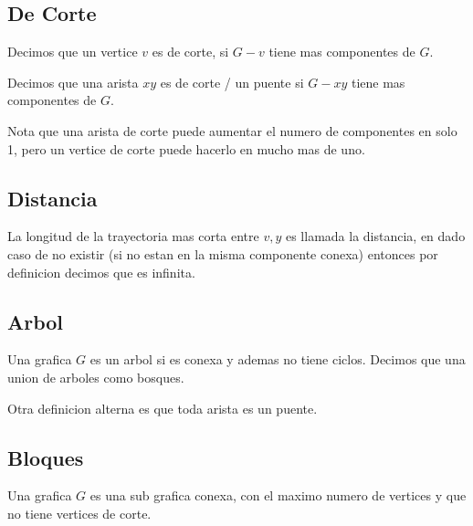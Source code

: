 \documentclass[12pt, fleqn]{report}                             %
\theoremstyle{break}                                            %
\begin{document}
            \subsection{De Corte}

            Decimos que un vertice $v$ es de corte, si $G-v$ tiene mas componentes de $G$.
            
            Decimos que una arista $xy$ es de corte / un puente si $G-xy$ tiene mas componentes de $G$.


            Nota que una arista de corte puede aumentar el numero de componentes en solo 1, pero un vertice
            de corte puede hacerlo en mucho mas de uno.


            \subsection{Distancia}

                La longitud de la trayectoria mas corta entre $v, y$ es llamada la distancia, en dado
                caso de no existir (si no estan en la misma componente conexa) entonces por definicion decimos 
                que es infinita.


            \subsection{Arbol}

                Una grafica $G$ es un arbol si es conexa y ademas no tiene ciclos.
                Decimos que una union de arboles como bosques.
                
                Otra definicion alterna es que toda arista es un puente.


            \subsection{Bloques}

                Una grafica $G$ es una sub grafica conexa, con el maximo numero de vertices
                y que no tiene vertices de corte. 
\end{document}
